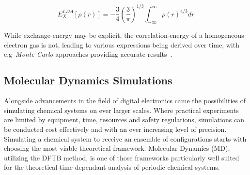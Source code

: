 \documentclass[12pt]{article}
\begin{document}
\begin{equation}
  E_X^{LDA}[\rho(r)] = -\frac{3}{4}\left(\frac{3}{\pi}\right)^{1/3}\int_{-\infty}^{\infty}\rho(r)^{4/3}dr
  \label{eq:lda2}
\end{equation}

\bigskip

\noindent While exchange-energy may be explicit, the correlation-energy of a homogeneous electron gas is not, leading to various expressions being derived over time, with e.g~\textit{Monte Carlo} approaches providing accurate results~\cite{Ceperley1980}.

\subsection{Molecular Dynamics Simulations}
Alongside advancements in the field of digital electronics came the possibilities of simulating chemical 
systems on ever larger scales. Where practical experiments are limited by equipment, time, resources and safety regulations, 
simulations can be conducted cost effectively and with an ever increasing level of precision.
Simulating a chemical system to receive an ensemble of configurations starts with choosing the most viable
theoretical framework. Molecular Dynamics (MD), utilizing the DFTB method, is one of those frameworks particularly well suited for  
the theoretical time-dependant analysis of periodic chemical systems. 


\end{document}
